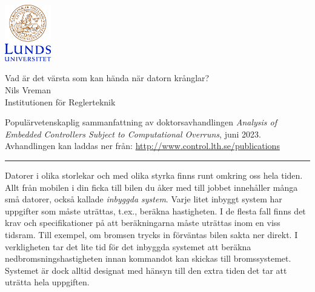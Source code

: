 \documentclass[svenska]{style/LTHthesis}
\begin{document}
\noindent
\begin{minipage}[]{0.25\textwidth}
    \noindent\includegraphics[width=20mm]{style/LUCsv}
    \par\vspace*{3mm} 
\end{minipage}\hfill
\begin{minipage}[]{0.74\textwidth}
    \vspace*{-3mm}
    \sffamily
    \begin{flushleft}
        \huge Vad är det värsta som kan hända när datorn krånglar? \\[2mm]
        \Large Nils Vreman\\[1mm]
        \normalsize Institutionen för Reglerteknik
    \end{flushleft}
\end{minipage}

\par\vspace{1mm}  

\begin{sffamily}\noindent
    Populärvetenskaplig sammanfattning av doktorsavhandlingen \emph{Analysis of Embedded Controllers Subject to Computational Overruns}, juni 2023.
    Avhandlingen kan laddas ner från: \url{http://www.control.lth.se/publications}
\end{sffamily}

\vspace{2mm}\hrule\vspace{3mm}

\noindent
Datorer i olika storlekar och med olika styrka finns runt omkring oss hela tiden.
Allt från mobilen i din ficka till bilen du åker med till jobbet innehåller många små datorer, också kallade \emph{inbyggda system}.
Varje litet inbyggt system har uppgifter som måste uträttas, t.ex., beräkna hastigheten.
I de flesta fall finns det krav och specifikationer på att beräkningarna måste uträttas inom en viss tidsram.
Till exempel, om bromsen trycks in förväntas bilen sakta ner direkt.
I verkligheten tar det lite tid för det inbyggda systemet att beräkna nedbromsningshastigheten innan kommandot kan skickas till bromssystemet.
Systemet är dock alltid designat med hänsyn till den extra tiden det tar att uträtta hela uppgiften.
\end{document}
